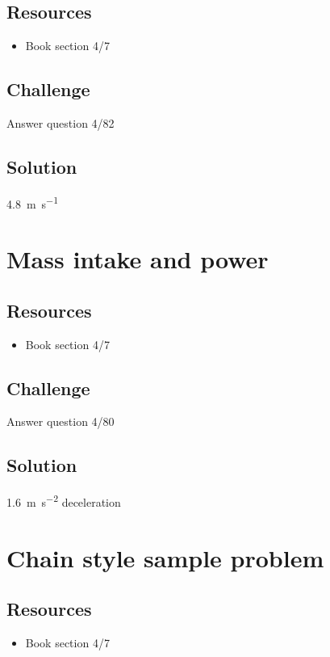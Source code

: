 \subsection*{Resources}
\begin{itemize}
    \item Book section 4/7
\end{itemize}

\subsection*{Challenge}
Answer question 4/82

\subsection*{Solution}
\SI{4.8}{\meter\per\second}




\newpage
\section{Mass intake and power}

\subsection*{Resources}
\begin{itemize}
    \item Book section 4/7
\end{itemize}

\subsection*{Challenge}
Answer question 4/80

\subsection*{Solution}
\SI{1.6}{\meter\per\square\second} deceleration




\newpage
\section{Chain style sample problem}

\subsection*{Resources}
\begin{itemize}
    \item Book section 4/7
\end{itemize}

